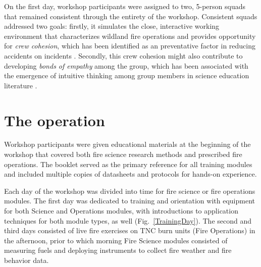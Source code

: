 \documentclass[fire,article,submit,moreauthors,pdftex]{Definitions/mdpi}
\begin{document}
On the first day, workshop participants were assigned to two, 5-person squads that remained consistent through the entirety of the workshop.
Consistent squads addressed two goals: firstly, it simulates the close, interactive working environment that characterizes wildland fire operations and provides opportunity for \emph{crew cohesion}, which has been identified as an preventative factor in reducing accidents on incidents \citep{mcdonald2003}.
Secondly, this crew cohesion might also contribute to developing \emph{bonds of empathy} among the group, which has been associated with the emergence of intuitive thinking among group members in science education literature \citep{park2020}.

\section{The operation}

Workshop participants were given educational materials at the beginning of the workshop that covered both fire science research methods and prescribed fire operations.
The booklet served as the primary reference for all training modules and included multiple copies of datasheets and protocols for hands-on experience.

Each day of the workshop was divided into time for fire science or fire operations modules.
The first day was dedicated to training and orientation with equipment for both Science and Operations modules, with introductions to application techniques for both module types, as well (Fig.~\ref{TrainingDay}).
The second and third days consisted of live fire exercises on TNC burn units (Fire Operations) in the afternoon, prior to which morning Fire Science modules consisted of measuring fuels and deploying instruments to collect fire weather and fire behavior data.
\end{document}
